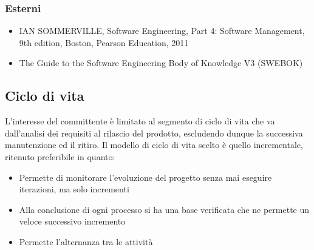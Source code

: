\subsubsection{Esterni}
\begin{itemize}
\item IAN SOMMERVILLE, Software Engineering, Part 4: Software Management, 9th edition, Boston, Pearson Education, 2011
\item The Guide to the Software Engineering Body of Knowledge V3 (SWEBOK)
\end{itemize}

\subsection{Ciclo di vita}
L’interesse del committente è limitato al segmento di ciclo di vita che va dall’analisi dei requisiti al
rilascio del prodotto, escludendo dunque la successiva manutenzione ed il ritiro. Il modello di ciclo di
vita scelto \`e quello incrementale, ritenuto preferibile in quanto:
\begin{itemize}
\item Permette di monitorare l'evoluzione del progetto senza mai eseguire iterazioni, ma solo incrementi
\item Alla conclusione di ogni processo si ha una base verificata che ne permette un veloce successivo incremento
\item Permette l'alternanza tra le attivit\`a
\end{itemize}
